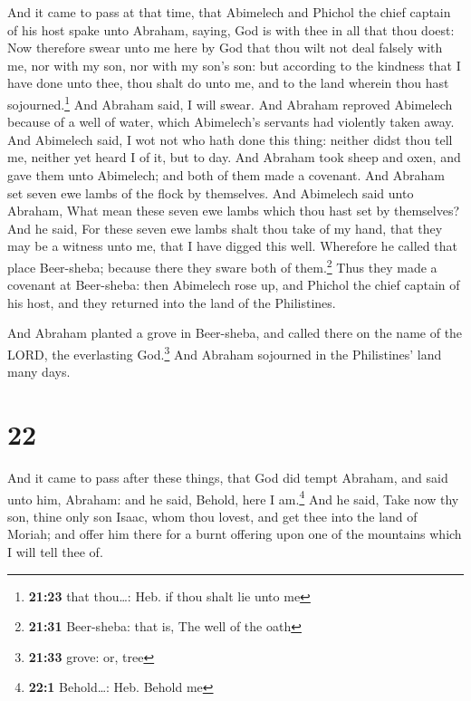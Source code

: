  And it came to pass at that time, that Abimelech and
Phichol the chief captain of his host spake unto Abraham, saying, God is
with thee in all that thou doest:  Now therefore swear
unto me here by God that thou wilt not deal falsely with me, nor with my
son, nor with my son's son: but according to the kindness that I have
done unto thee, thou shalt do unto me, and to the land wherein thou hast
sojourned.\footnote{\textbf{21:23} that thou\ldots: Heb. if thou shalt
  lie unto me}  And Abraham said, I will swear.
 And Abraham reproved Abimelech because of a well of
water, which Abimelech's servants had violently taken away.
 And Abimelech said, I wot not who hath done this thing:
neither didst thou tell me, neither yet heard I of it, but to day.
 And Abraham took sheep and oxen, and gave them unto
Abimelech; and both of them made a covenant.  And Abraham
set seven ewe lambs of the flock by themselves.  And
Abimelech said unto Abraham, What mean these seven ewe lambs which thou
hast set by themselves?  And he said, For these seven ewe
lambs shalt thou take of my hand, that they may be a witness unto me,
that I have digged this well.  Wherefore he called that
place Beer-sheba; because there they sware both of them.\footnote{\textbf{21:31}
  Beer-sheba: that is, The well of the oath}  Thus they
made a covenant at Beer-sheba: then Abimelech rose up, and Phichol the
chief captain of his host, and they returned into the land of the
Philistines.

 And Abraham planted a grove in Beer-sheba, and called
there on the name of the LORD, the everlasting God.\footnote{\textbf{21:33}
  grove: or, tree}  And Abraham sojourned in the
Philistines' land many days.

\hypertarget{section-21}{%
\section{22}\label{section-21}}

 And it came to pass after these things, that God did
tempt Abraham, and said unto him, Abraham: and he said, Behold, here I
am.\footnote{\textbf{22:1} Behold\ldots: Heb. Behold me} 
And he said, Take now thy son, thine only son Isaac, whom thou lovest,
and get thee into the land of Moriah; and offer him there for a burnt
offering upon one of the mountains which I will tell thee of.

